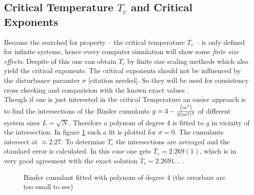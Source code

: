 \subsection{Critical Temperature $T_c$ and Critical Exponents}
    Because the searched for property -- the critical temperature \(T_c\)
    -- is only defined for infinite systems, hence every computer
    simulation will show some \emph{finte size effects}.
    Despite of this one can obtain \(T_c\) by finite size scaling
    methods \cite[S. ??]{Newman1998} which also yield the critical
    exponents. The critical exponents should not be influenced by the
    disturbance paramter \(\sigma\) [citation needed]. So they will be
    used for consistency cross checking and comparision with the known
    exact values \cite[S. 59]{Pelissetto2002}.\\
    Though if one is just interested in the critical Temperature an
    easier approach is to find the intersections of the Binder cumulants
    \(g = 3-\frac{\left< m^4 \right>}{2\left< m^2 \right>^2}\) \cite{Binder1981} of different
    system sizes \(L=\sqrt N\).
    Therefore a polynom of degree 4 is fitted to \(g\) in vicinity of
    the intersection.
    In figure \ref{fig:binder_fit_s_0} such a fit is plotted for
    \(\sigma=0\). The cumulants intersect at \(\approx 2.27\).
    To determine \(T_c\) the intersections are averaged and the standard
    error is calculated. In this case one gets \(T_c = 2.269(1)\), which
    is in very good agreement with the exact solution
    \(T_c = 2.2691...\) \cite{Onsager1944}.\\
    \begin{figure}[htbp]
        \centering
        \caption[Binder cumulant fitted with polynom of degree 4]
                {Binder cumulant fitted with polynom of degree 4
                (the errorbars are too small to see)}
        \label{fig:binder_fit_s_0}
    \end{figure}%

